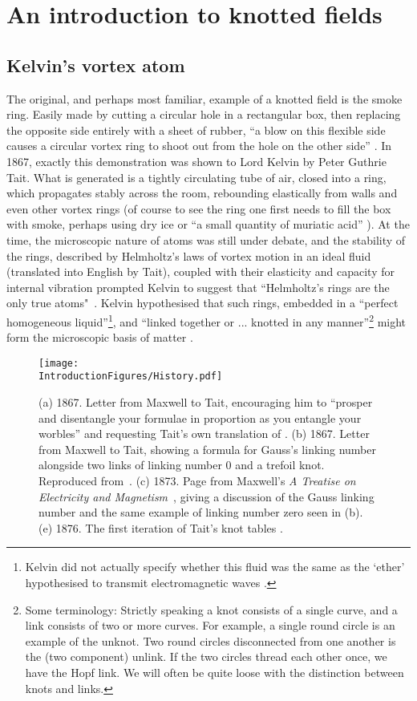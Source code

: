 \chapter{An introduction to knotted fields}
\section{Kelvin's vortex atom}
\label{sec:Kelvin}
The original, and perhaps most familiar, example of a knotted field is the smoke ring. Easily made by cutting a circular hole in a rectangular box, then replacing the opposite side entirely with a sheet of rubber, ``a blow on this flexible side causes a circular vortex ring to shoot out from the hole on the other side'' \citep{Kelvin}. In 1867, exactly this demonstration was shown to Lord Kelvin by Peter Guthrie Tait. What is generated is a tightly circulating tube of air, closed into a ring, which propagates stably across the room, rebounding elastically from walls and even other vortex rings (of course to see the ring one first needs to fill the box with smoke, perhaps using dry ice or ``a small quantity of muriatic acid'' \citep{Kelvin}). At the time, the microscopic nature of atoms was still under debate, and the stability of the rings, described by Helmholtz's laws of vortex motion in an ideal fluid \citep{Helmholtz} (translated into English by Tait), coupled with their elasticity and capacity for internal vibration \citep{KelvinAMS,KelvinMasters} prompted Kelvin to suggest that ``Helmholtz's rings are the only true atoms"~\citep{Kelvin}. Kelvin hypothesised that such rings, embedded in a ``perfect homogeneous liquid''\footnote{Kelvin did not actually specify whether this fluid was the same as the `ether' hypothesised to transmit electromagnetic waves \citep{KelvinMasters}.}, and ``linked together or ... knotted in any manner''\footnote{Some terminology: Strictly speaking a knot consists of a single curve, and a link consists of two or more curves. For example, a single round circle is an example of the unknot. Two round circles disconnected from one another is the (two component) unlink. If the two circles thread each other once, we have the Hopf link. We will often be quite loose with the distinction between knots and links.} might form the microscopic basis of matter \citep{Kelvin}.
\begin{figure}[htbp]
\centering
\texttt{[image: \\IntroductionFigures/History.pdf]}
\caption[Letters from Maxwell to Tait.]{(a) 1867. Letter from Maxwell to Tait, encouraging him to ``prosper and disentangle your formulae in proportion as you entangle your worbles'' and requesting Tait's own translation of \citep{Helmholtz}. (b) 1867. Letter from Maxwell to Tait, showing a formula for Gauss's linking number alongside two links of linking number 0 and a trefoil knot. Reproduced from~\citep{Ricca2011}. (c) 1873. Page from Maxwell's \emph{A Treatise on Electricity and Magnetism}~\citep{Maxwell2}, giving a discussion of the Gauss linking number and the same example of linking number zero seen in (b). (e) 1876. The first iteration of Tait's knot tables \citep{Tait1}.}
\label{fig:History}
\end{figure}

